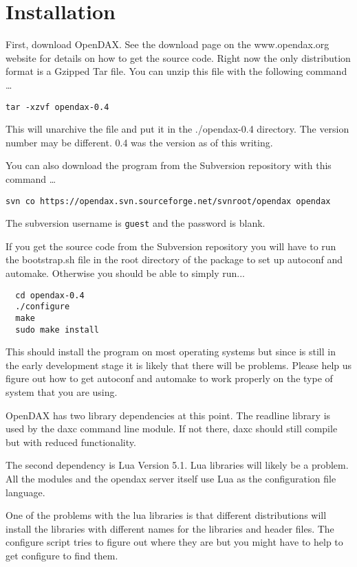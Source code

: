 \section{Installation}

First, download OpenDAX. See the download page on the www.opendax.org website for details on how to get the source code.  Right now the only distribution format is a Gzipped Tar file.  You can unzip this file with the following command \ldots

\verb|tar -xzvf opendax-0.4|

This will unarchive the file and put it in the ./opendax-0.4 directory.  The version number may be different.  0.4 was the version as of this writing.

You can also download the program from the Subversion repository with this command \ldots

\begin{verbatim}
svn co https://opendax.svn.sourceforge.net/svnroot/opendax opendax
\end{verbatim}
The subversion username is \texttt{guest} and the password is blank.

If you get the source code from the Subversion repository you will have to run the bootstrap.sh file in the root directory of the package to set up autoconf and automake. Otherwise you should be able to simply run...

\begin{verbatim}
  cd opendax-0.4
  ./configure
  make
  sudo make install 
\end{verbatim} 

This should install the program on most operating systems but since \opendax is still in the early development stage it is likely that there will be problems. Please help us figure out how to get autoconf and automake to work properly on the type of system that you are using.

OpenDAX has two library dependencies at this point. The readline library is used by the daxc command line module. If not there, daxc should still compile but with reduced functionality.

The second dependency is Lua Version 5.1. Lua libraries will likely be a problem. All the modules and the opendax server itself use Lua as the configuration file language.

One of the problems with the lua libraries is that different distributions will install the libraries with different names for the libraries and header files. The configure script tries to figure out where they are but you might have to help to get configure to find them.


